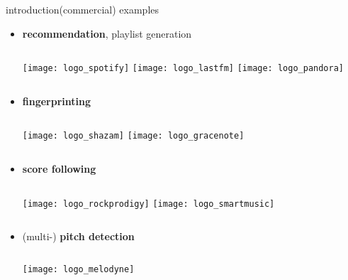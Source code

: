         \begin{frame}{introduction}{(commercial) examples}
            \begin{itemize}
                \item   \textbf{recommendation}, playlist generation
                    \begin{columns}
                            \texttt{[image: logo\_spotify]}
                            \texttt{[image: logo\_lastfm]}
                            \texttt{[image: logo\_pandora]}
                    \end{columns}
                \bigskip
                \item<2->   \textbf{fingerprinting} 
                    \begin{columns}
                            \texttt{[image: logo\_shazam]}
                            \texttt{[image: logo\_gracenote]}
                    \end{columns}
                \bigskip
                \item<3->   \textbf{score following} 
                   \begin{columns}
                            \texttt{[image: logo\_rockprodigy]}
                            \texttt{[image: logo\_smartmusic]}
                    \end{columns}
                \bigskip
                \item<4->   (multi-) \textbf{pitch detection} 
                    \begin{columns}
                            \texttt{[image: logo\_melodyne]}
                    \end{columns}
            \end{itemize}
        \end{frame}

